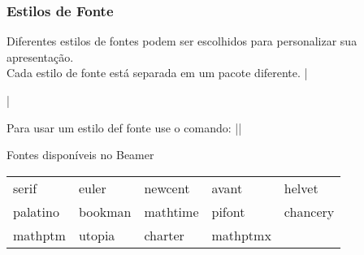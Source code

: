 
\begin{frame}[fragile]
  \frametitle{Estilos de Fonte}

  Diferentes estilos de fontes podem ser escolhidos para personalizar sua apresentação. \\

  Cada estilo de fonte está separada em um pacote diferente.
  |\usepackage{helvet}|

  Para usar um estilo def fonte use o comando:
  ||

  \begin{block}{Fontes disponíveis no Beamer}
    \begin{tabular}{l l l l l}
      serif & euler & newcent & avant & helvet \\
      palatino & bookman & mathtime & pifont & chancery \\
      mathptm & utopia & charter & mathptmx \\
    \end{tabular}
  \end{block}

\end{frame}
